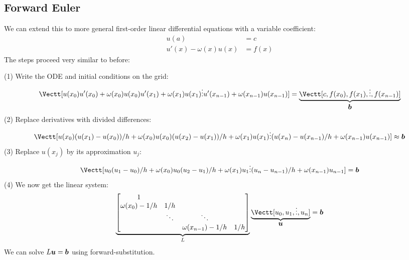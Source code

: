 \subsection{Forward Euler}
We can extend this to more general first-order linear differential equations with a variable coefficient:
\begin{align*}
u(a) &= c \\
u'(x) - \ensuremath{\omega}(x) u(x) &= f(x)
\end{align*}
The steps proceed very similar to before:

(1) Write the ODE and initial conditions on the grid:
\[
\Vectt[u(x_0) \\ 
u'(x_0) + \ensuremath{\omega}(x_0) u(x_0) \\
u'(x_1) + \ensuremath{\omega}(x_1) u(x_1) \\
\ensuremath{\vdots} \\
u'(x_{n-1})+ \ensuremath{\omega}(x_{n-1}) u(x_{n-1})] = \underbrace{\Vectt[c, f(x_0), f(x_1), \ensuremath{\vdots} , f(x_{n-1})]}_{\ensuremath{\bm{\b}}}
\]
(2) Replace derivatives with divided differences:
\[
\Vectt[u(x_0) \\ 
(u(x_1) - u(x_0))/h + \ensuremath{\omega}(x_0)u(x_0) \\
(u(x_2) - u(x_1))/h + \ensuremath{\omega}(x_1)u(x_1) \\
\ensuremath{\vdots} \\
(u(x_n) - u(x_{n-1})/h + \ensuremath{\omega}(x_{n-1})u(x_{n-1})] \ensuremath{\approx} \ensuremath{\bm{\b}}
\]
(3) Replace $u(x_j)$  by its approximation $u_j$:
\[
\Vectt[u_0 \\ 
(u_1 - u_0)/h + \ensuremath{\omega}(x_0) u_0 \\
(u_2 - u_1)/h + \ensuremath{\omega}(x_1) u_1 \\
\ensuremath{\vdots} \\
(u_n - u_{n-1})/h  + \ensuremath{\omega}(x_{n-1}) u_{n-1}] = \ensuremath{\bm{\b}}
\]
(4) We now get the linear system:
\[
\underbrace{\begin{bmatrix}
    1 \\ 
    \ensuremath{\omega}(x_0)-1/h & 1/h \\
    & \ensuremath{\ddots} & \ensuremath{\ddots} \\
    && \ensuremath{\omega}(x_{n-1})-1/h & 1/h \end{bmatrix}}_L \underbrace{\Vectt[u_0,u_1,\ensuremath{\vdots},u_n]}_{\ensuremath{\bm{\u}}} = \ensuremath{\bm{\b}}
\]
We can solve $L \bm{{\mbox{\boldmath$u$\unboldmath}}} = \bm{{\mbox{\boldmath$b$\unboldmath}}}$ using forward-substitution.

